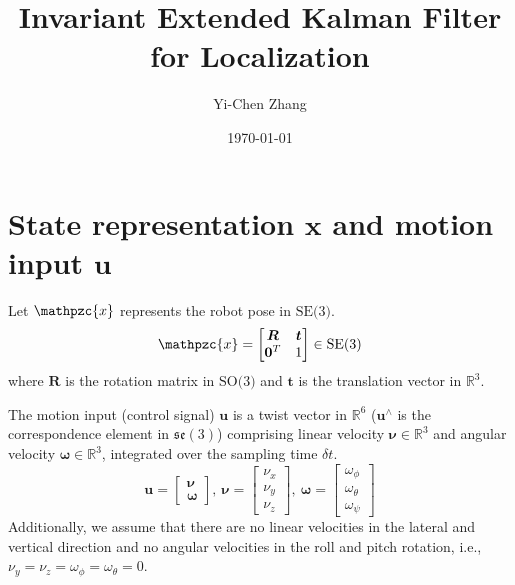 \documentclass[12pt, a4paper]{article}
\title{Invariant Extended Kalman Filter for Localization}
\author{Yi-Chen Zhang}
\date{\today}
\begin{document}
\maketitle

\section{State representation $\bm{x}$ and motion input $\bm{u}$}
Let $\mathpzc{x}$ represents the robot pose in $\text{SE(3)}$.
\[
  \mathpzc{x}=\begin{bmatrix}
    \bm{R} & \bm{t}\\
    \bm{0}^{T} & 1
  \end{bmatrix}\in \text{SE(3)}
\]
where $\bm{R}$ is the rotation matrix in $\text{SO(3)}$ and $\bm{t}$ is the
translation vector in $\mathbb{R}^{3}$.

The motion input (control signal) $\bm{u}$ is a twist vector in $\mathbb{R}^{6}$
($\bm{u}^{\wedge}$ is the correspondence element in $\mathfrak{se}(3)$)
comprising linear velocity $\bm{\nu}\in \mathbb{R}^{3}$ and angular velocity
$\bm{\omega} \in \mathbb{R}^{3}$, integrated over the sampling time $\delta t$.
\[
  \bm{u}=\begin{bmatrix}
    \bm{\nu}\\
    \bm{\omega}
  \end{bmatrix},~
  \bm{\nu}=\begin{bmatrix}
    \nu_{x}\\
    \nu_{y}\\
    \nu_{z}
  \end{bmatrix},~
  \bm{\omega}=\begin{bmatrix}
    \omega_{\phi}\\
    \omega_{\theta}\\
    \omega_{\psi}
  \end{bmatrix}
\]
Additionally, we assume that there are no linear velocities in the lateral and
vertical direction and no angular velocities in the roll and pitch rotation,
i.e., $\nu_{y}=\nu_{z}=\omega_{\phi}=\omega_{\theta}=0$.
\end{document}
